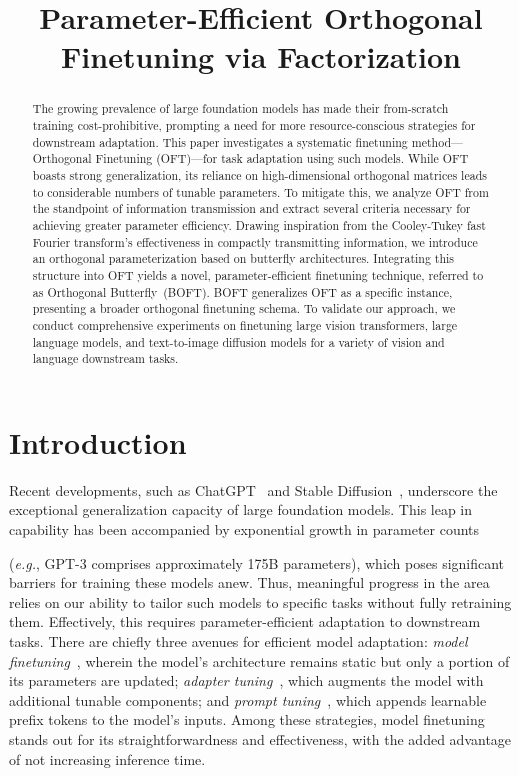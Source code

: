 \title{Parameter-Efficient Orthogonal Finetuning via Factorization}

\begin{abstract}
The growing prevalence of large foundation models has made their from-scratch training cost-prohibitive, prompting a need for more resource-conscious strategies for downstream adaptation. This paper investigates a systematic finetuning method—Orthogonal Finetuning (OFT)—for task adaptation using such models. While OFT boasts strong generalization, its reliance on high-dimensional orthogonal matrices leads to considerable numbers of tunable parameters. To mitigate this, we analyze OFT from the standpoint of information transmission and extract several criteria necessary for achieving greater parameter efficiency. Drawing inspiration from the Cooley-Tukey fast Fourier transform’s effectiveness in compactly transmitting information, we introduce an orthogonal parameterization based on butterfly architectures. Integrating this structure into OFT yields a novel, parameter-efficient finetuning technique, referred to as Orthogonal Butterfly~(BOFT). BOFT generalizes OFT as a specific instance, presenting a broader orthogonal finetuning schema. To validate our approach, we conduct comprehensive experiments on finetuning large vision transformers, large language models, and text-to-image diffusion models for a variety of vision and language downstream tasks.
\end{abstract}

\section{Introduction}

Recent developments, such as ChatGPT~\cite{brown2020language,chen2021evaluating} and Stable Diffusion~\cite{rombach2022high}, underscore the exceptional generalization capacity of large foundation models. This leap in capability has been accompanied by exponential growth in parameter counts 

(\emph{e.g.}, GPT-3 comprises approximately 175B parameters), which poses significant barriers for training these models anew. Thus, meaningful progress in the area relies on our ability to tailor such models to specific tasks without fully retraining them. Effectively, this requires parameter-efficient adaptation to downstream tasks. There are chiefly three avenues for efficient model adaptation: \emph{model finetuning}~\cite{hulora2022,zaken2022bitfit,guo2020parameter,raffel2020exploring,qiu2023controlling,zhang2022adaptive,chavan2023one}, wherein the model’s architecture remains static but only a portion of its parameters are updated; \emph{adapter tuning}~\cite{rebuffi2017learning,houlsby2019parameter,pfeiffer2020adapterfusion,lin2020exploring,he2021towards}, which augments the model with additional tunable components; and \emph{prompt tuning}~\cite{li2021prefix,lester2021power}, which appends learnable prefix tokens to the model’s inputs. Among these strategies, model finetuning stands out for its straightforwardness and effectiveness, with the added advantage of not increasing inference time.

